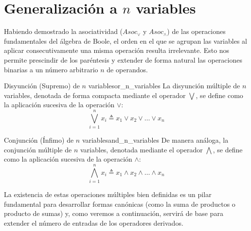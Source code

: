 \section{Generalización a $n$ variables}

Habiendo demostrado la asociatividad ($Asoc_\vee$ y $Asoc_\wedge$) de las operaciones fundamentales del álgebra de Boole, el orden en el que se agrupan las variables al aplicar consecutivamente una misma operación resulta irrelevante. Esto nos permite prescindir de los paréntesis y extender de forma natural las operaciones binarias a un número arbitrario $n$ de operandos.

\begin{definicion}{Disyunción (Supremo) de $n$ variables}{or_n_variables}
La disyunción múltiple de $n$ variables, denotada de forma compacta mediante el operador $\bigvee$, se define como la aplicación sucesiva de la operación $\vee$:
\[ \bigvee_{i=1}^n x_i \triangleq x_1 \vee x_2 \vee \dots \vee x_n \]
\end{definicion}

\begin{definicion}{Conjunción (Ínfimo) de $n$ variables}{and_n_variables}
De manera análoga, la conjunción múltiple de $n$ variables, denotada mediante el operador $\bigwedge$, se define como la aplicación sucesiva de la operación $\wedge$:
\[ \bigwedge_{i=1}^n x_i \triangleq x_1 \wedge x_2 \wedge \dots \wedge x_n \]
\end{definicion}

La existencia de estas operaciones múltiples bien definidas es un pilar fundamental para desarrollar formas canónicas (como la suma de productos o producto de sumas) y, como veremos a continuación, servirá de base para extender el número de entradas de los operadores derivados.


